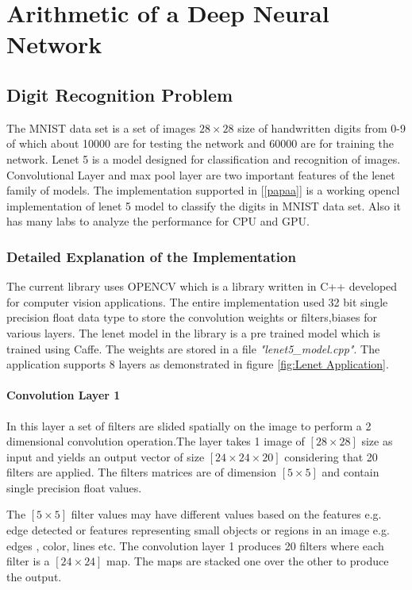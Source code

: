 \chapter{Arithmetic of a Deep Neural Network}\label{Chapter5}
\section {Digit Recognition Problem}
The MNIST data set is a set of images $28\times 28$ size of handwritten digits from 0-9 of which about 10000 are for testing the network and 60000 are for training the network.
Lenet 5 is a model designed for classification and recognition of images.
Convolutional Layer and max pool layer are two important features of the lenet family of models.
The implementation supported in [\ref{papaa}] is a working opencl implementation of lenet 5 model to classify the digits in MNIST data set. Also it has many labs to analyze the performance for CPU and GPU.
\subsection{Detailed Explanation of the Implementation}
The current library uses OPENCV which is a library written in C++ developed for computer vision applications. The entire implementation used 32 bit single precision float data type to store the convolution weights or filters,biases for various layers.  The lenet model in the library is a pre trained model which is trained using Caffe. The weights are stored in a file \textit{"lenet5\_model.cpp"}.
The application supports 8 layers as demonstrated in figure \ref{fig:Lenet Application}. %


\subsubsection{Convolution Layer 1}\label{Convolution layer 1}
In this layer a set of filters are slided spatially on the image to perform a 2 dimensional convolution operation.The layer takes 1 image of $[28\times 28]$ size as input and yields an output vector of size $[24\times 24 \times 20]$ considering that 20 filters are applied. The filters matrices are of dimension $[5\times 5]$ and contain single precision float values. 

\noindent The $[5\times 5]$ filter values may have different values based on the features e.g. edge detected or features representing small objects or regions in  an image e.g. edges , color, lines etc. The convolution layer 1 produces 20 filters where each filter is a $[24\times 24]$ map. The maps are stacked one over the other to produce the output.
